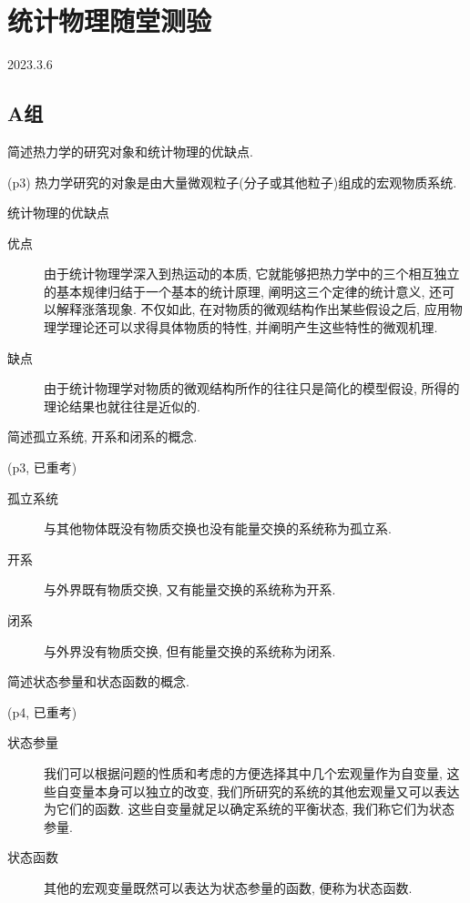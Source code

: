 \section{统计物理随堂测验}
2023.3.6
\subsection{A组}
\begin{questions}
  \question 简述热力学的研究对象和统计物理的优缺点.
  \begin{solution}
    (p3)
    热力学研究的对象是由大量微观粒子(分子或其他粒子)组成的宏观物质系统.

    统计物理的优缺点
    \begin{description}
      \item[优点] 由于统计物理学深入到热运动的本质, 它就能够把热力学中的三个相互独立的基本规律归结于一个基本的统计原理, 阐明这三个定律的统计意义, 还可以解释涨落现象. 不仅如此, 在对物质的微观结构作出某些假设之后, 应用物理学理论还可以求得具体物质的特性, 并阐明产生这些特性的微观机理.
      \item[缺点] 由于统计物理学对物质的微观结构所作的往往只是简化的模型假设, 所得的理论结果也就往往是近似的.
    \end{description}
  \end{solution}
  \question 简述孤立系统, 开系和闭系的概念.
  \begin{solution}
    (p3, 已重考)
    \begin{description}
      \item[孤立系统] 与其他物体既没有物质交换也没有能量交换的系统称为孤立系.
      \item[开系] 与外界既有物质交换, 又有能量交换的系统称为开系.
      \item[闭系] 与外界没有物质交换, 但有能量交换的系统称为闭系.
    \end{description}
  \end{solution}
  \question 简述状态参量和状态函数的概念.
  \begin{solution}
    (p4, 已重考)
    \begin{description}
      \item[状态参量]  我们可以根据问题的性质和考虑的方便选择其中几个宏观量作为自变量, 这些自变量本身可以独立的改变, 我们所研究的系统的其他宏观量又可以表达为它们的函数. 这些自变量就足以确定系统的平衡状态, 我们称它们为状态参量.
      \item[状态函数] 其他的宏观变量既然可以表达为状态参量的函数, 便称为状态函数.
    \end{description}

\end{solution}
\end{questions}
